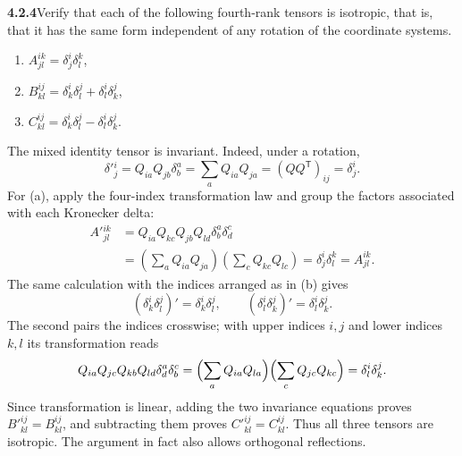 \par\bigskip
\noindent\textbf{4.2.4}\quad Verify that each of the following fourth-rank
tensors is isotropic, that is, that it has the same form independent of any
rotation of the coordinate systems.
\begin{enumerate}
\item[(a)] $A_{jl}^{ik}=\delta_{j}^{i}\delta_{l}^{k}$,
\item[(b)] $B_{kl}^{ij}=\delta_{k}^{i}\delta_{l}^{j}
  +\delta_{l}^{i}\delta_{k}^{j}$,
\item[(c)] $C_{kl}^{ij}=\delta_{k}^{i}\delta_{l}^{j}
  -\delta_{l}^{i}\delta_{k}^{j}$.
\end{enumerate}
\solution
The mixed identity tensor is invariant. Indeed, under a rotation,
\[
\delta'{}^i_j
=Q_{ia}Q_{jb}\delta^a_b
=\sum_aQ_{ia}Q_{ja}
=(QQ^{\mathsf T})_{ij}=\delta^i_j.
\]
For (a), apply the four-index transformation law and group the factors
associated with each Kronecker delta:
\begin{align*}
A'{}^{ik}_{jl}
&=Q_{ia}Q_{kc}Q_{jb}Q_{ld}\delta^a_b\delta^c_d\\
&=\left(\sum_aQ_{ia}Q_{ja}\right)
  \left(\sum_cQ_{kc}Q_{lc}\right)
=\delta^i_j\delta^k_l=A^{ik}_{jl}.
\end{align*}
The same calculation with the indices arranged as in (b) gives
\[
(\delta^i_k\delta^j_l)'=\delta^i_k\delta^j_l,
\qquad
(\delta^i_l\delta^j_k)'=\delta^i_l\delta^j_k.
\]
The second pairs the indices crosswise; with upper indices $i,j$ and
lower indices $k,l$ its transformation reads
\[
Q_{ia}Q_{jc}Q_{kb}Q_{ld}\delta^a_d\delta^c_b
=\Bigl(\sum_aQ_{ia}Q_{la}\Bigr)\Bigl(\sum_cQ_{jc}Q_{kc}\Bigr)
=\delta^i_l\delta^j_k.
\]
Since transformation is linear, adding the two invariance equations proves
$B'{}^{ij}_{kl}=B^{ij}_{kl}$, and subtracting them proves
$C'{}^{ij}_{kl}=C^{ij}_{kl}$. Thus all three tensors are isotropic.
The argument in fact also allows orthogonal reflections.

